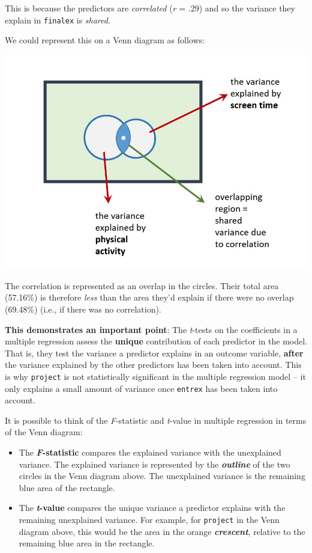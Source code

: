 \documentclass[
]{book}
\theoremstyle{definition}
\theoremstyle{definition}
\theoremstyle{definition}
\theoremstyle{definition}
\theoremstyle{remark}
\begin{document}
This is because the predictors are \emph{correlated} (\emph{r} = .29) and so the variance they explain in \texttt{finalex} is \emph{shared}.

\hfill\break
We could represent this on a Venn diagram as follows:

\includegraphics{images/Venn3.jpg}

The correlation is represented as an overlap in the circles. Their total area (57.16\%) is therefore \emph{less} than the area they'd explain if there were no overlap (69.48\%) (i.e., if there was no correlation).

\textbf{This demonstrates an important point}: The \emph{t}-tests on the coefficients in a multiple regression assess the \textbf{unique} contribution of each predictor in the model. That is, they test the variance a predictor explains in an outcome variable, \textbf{after} the variance explained by the other predictors has been taken into account. This is why \texttt{project} is not statistically significant in the multiple regression model -- it only explains a small amount of variance once \texttt{entrex} has been taken into account.

It is possible to think of the \emph{F}-statistic and \emph{t}-value in multiple regression in terms of the Venn diagram:

\begin{itemize}
\item
  The \textbf{\emph{F}-statistic} compares the explained variance with the unexplained variance. The explained variance is represented by the \textbf{\emph{outline}} of the two circles in the Venn diagram above. The unexplained variance is the remaining blue area of the rectangle.
\item
  The \textbf{\emph{t}-value} compares the unique variance a predictor explains with the remaining unexplained variance. For example, for \texttt{project} in the Venn diagram above, this would be the area in the orange \textbf{\emph{crescent}}, relative to the remaining blue area in the rectangle.
\end{itemize}
\end{document}
